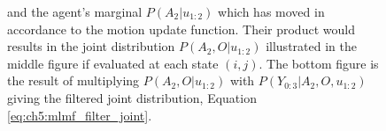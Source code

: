 \begin{figure}
{ and the agent's marginal $P(A_2|u_{1:2})$ which has moved in accordance to the motion update function. Their product would results in 
 the joint distribution $P(A_2,O|u_{1:2})$ illustrated in the middle figure if evaluated at each state $(i,j)$. The bottom figure is the result
 of multiplying $P(A_2,O|u_{1:2})$ with  $P(Y_{0:3}|A_2,O,u_{1:2})$ giving the filtered joint distribution, Equation \ref{eq:ch5:mlmf_filter_joint}.
 }
 \label{fig:maringal_joint_example_v2}
\end{figure}
 




